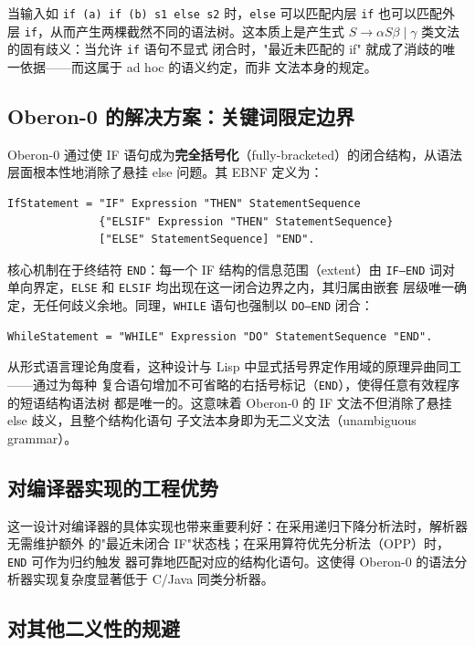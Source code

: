 \documentclass[a4paper]{article}
\begin{document}
当输入如 \texttt{if (a) if (b) s1 else s2} 时，\texttt{else} 可以匹配内层 \texttt{if}
也可以匹配外层 \texttt{if}，从而产生两棵截然不同的语法树。这本质上是产生式
$S \to \alpha S \beta \mid \gamma$ 类文法的固有歧义：当允许 \texttt{if} 语句不显式
闭合时，"最近未匹配的 if" 就成了消歧的唯一依据——而这属于 ad hoc 的语义约定，而非
文法本身的规定。

\subsection{Oberon-0 的解决方案：关键词限定边界}

Oberon-0 通过使 IF 语句成为\textbf{完全括号化}（fully-bracketed）的闭合结构，从语法
层面根本性地消除了悬挂 else 问题。其 EBNF 定义为：

\begin{verbatim}
IfStatement = "IF" Expression "THEN" StatementSequence
              {"ELSIF" Expression "THEN" StatementSequence}
              ["ELSE" StatementSequence] "END".
\end{verbatim}

核心机制在于终结符 \texttt{END}：每一个 IF 结构的信息范围（extent）由 \texttt{IF--END}
词对单向界定，\texttt{ELSE} 和 \texttt{ELSIF} 均出现在这一闭合边界之内，其归属由嵌套
层级唯一确定，无任何歧义余地。同理，\texttt{WHILE} 语句也强制以 \texttt{DO--END}
闭合：

\begin{verbatim}
WhileStatement = "WHILE" Expression "DO" StatementSequence "END".
\end{verbatim}

从形式语言理论角度看，这种设计与 Lisp 中显式括号界定作用域的原理异曲同工——通过为每种
复合语句增加不可省略的右括号标记（\texttt{END}），使得任意有效程序的短语结构语法树
都是唯一的。这意味着 Oberon-0 的 IF 文法不但消除了悬挂 else 歧义，且整个结构化语句
子文法本身即为无二义文法（unambiguous grammar）。

\subsection{对编译器实现的工程优势}

这一设计对编译器的具体实现也带来重要利好：在采用递归下降分析法时，解析器无需维护额外
的"最近未闭合 IF"状态栈；在采用算符优先分析法（OPP）时，\texttt{END} 可作为归约触发
器可靠地匹配对应的结构化语句。这使得 Oberon-0 的语法分析器实现复杂度显著低于 C/Java
同类分析器。

\subsection{对其他二义性的规避}
\end{document}
